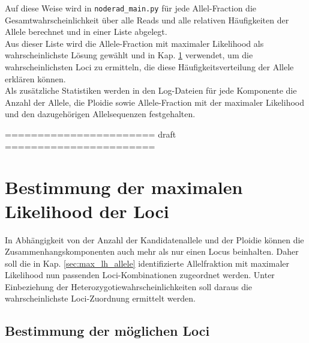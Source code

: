 Auf diese Weise wird in \lstinline|noderad_main.py| für jede Allel-Fraction die Gesamtwahrscheinlichkeit über alle Reads und alle relativen Häufigkeiten der Allele berechnet und in einer Liste abgelegt. \\

Aus dieser Liste wird die Allele-Fraction mit maximaler Likelihood als wahrscheinlichste Lösung gewählt und in Kap. \ref{sec:max_lh_loci} verwendet, um die wahrscheinlichsten Loci zu ermitteln, die diese Häufigkeitsverteilung der Allele erklären können.  \\

Als zusätzliche Statistiken werden in den Log-Dateien für jede Komponente die Anzahl der Allele, die Ploidie sowie Allele-Fraction mit der maximaler Likelihood und den dazugehörigen Allelsequenzen festgehalten.


\noindent======================= draft =======================\\

\section{Bestimmung der maximalen Likelihood der Loci} \label{sec:max_lh_loci}

In Abhängigkeit von der Anzahl der Kandidatenallele und der Ploidie können die Zusammenhangskomponenten auch mehr als nur einen Locus beinhalten. Daher soll die in Kap. \ref{sec:max_lh_allele} identifizierte Allelfraktion mit maximaler Likelihood nun passenden Loci-Kombinationen zugeordnet werden. Unter Einbeziehung der Heterozygotiewahrscheinlichkeiten soll daraus die wahrscheinlichste Loci-Zuordnung ermittelt werden.

\subsection{Bestimmung der möglichen Loci} \label{subsec:comb_loci}

